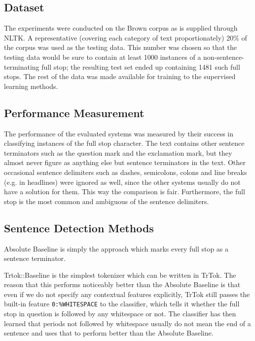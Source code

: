 \subsection{Dataset}

The experiments were conducted on the Brown corpus as is supplied
through NLTK. A representative (covering each category of text
proportionately) 20\% of the corpus was used as the testing data. This
number was chosen so that the testing data would be sure to contain at
least 1000 instances of a non-sentence-terminating full stop; the
resulting test set ended up containing 1481 such full stops. The rest
of the data was made available for training to the supervised learning
methods.

\subsection{Performance Measurement}

The performance of the evaluated systems was measured by their success
in classifying instances of the full stop character. The text contains
other sentence terminators such as the question mark and the
exclamation mark, but they almost never figure as anything else but
sentence terminators in the text. Other occasional sentence delimiters
such as dashes, semicolons, colons and line breaks (e.g. in headlines)
were ignored as well, since the other systems usually do not have a
solution for them. This way the comparison is fair. Furthermore, the
full stop is the most common and ambiguous of the sentence delimiters.

\subsection{Sentence Detection Methods}

Absolute Baseline is simply the approach which marks every full stop as
a sentence terminator.

Trtok::Baseline is the simplest tokenizer which can be written in
TrTok. The reason that this performs noticeably better than the
Absolute Baseline is that even if we do not specify any contextual
features explicitly, TrTok still passes the built-in feature
\texttt{0:\%WHITESPACE} to the classifier, which tells it whether the
full stop in question is followed by any whitespace or not. The
classifier has then learned that periods not followed by whitespace
usually do not mean the end of a sentence and uses that to perform
better than the Absolute Baseline.


